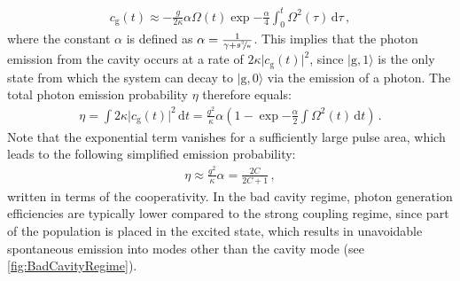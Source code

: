 \documentclass[../Thesis-IJspeert.tex]{subfiles}
\begin{document}
\begin{align}
	c_\mathrm{g}(t)\approx-\frac{g}{2\kappa} \alpha \Omega(t) \exp{-\frac{\alpha}{4} \int_{0}^{t} \Omega^2(\tau) \,\mathrm{d}\tau}\,,
\end{align} 
where the constant $\alpha$ is defined as $\alpha=\frac{1}{\gamma+\sfrac{g^2\!}{\kappa}}$. This implies that the photon emission from the cavity occurs at a rate of $2\kappa \vert c_\mathrm{g}(t)\vert^2$, since $\vert \mathrm{g}, 1 \rangle$ is the only state from which the system can decay to $\vert \mathrm{g}, 0 \rangle$ via the emission of a photon. The total photon emission probability $\eta$ therefore equals:
\begin{align}
 \eta = \int 2\kappa \vert c_\mathrm{g}(t)\vert^2 \,\mathrm{d}t=\frac{g^2}{\kappa}\alpha \left( 1 -  \exp{-\frac{\alpha}{2} \int \Omega^2(t) \,\mathrm{d}t} \right)\,.
\end{align}
Note that the exponential term vanishes for a sufficiently large pulse area, which leads to the following simplified emission probability:
\begin{align}
\eta\approx \frac{g^2}{\kappa}\alpha = \frac{2C}{2C+1}\,,
\end{align}
written in terms of the cooperativity. In the bad cavity regime, photon generation efficiencies are typically lower compared to the strong coupling regime, since part of the population is placed in the excited state, which results in unavoidable spontaneous emission into modes other than the cavity mode (see \autoref{fig:BadCavityRegime}).
\end{document}
